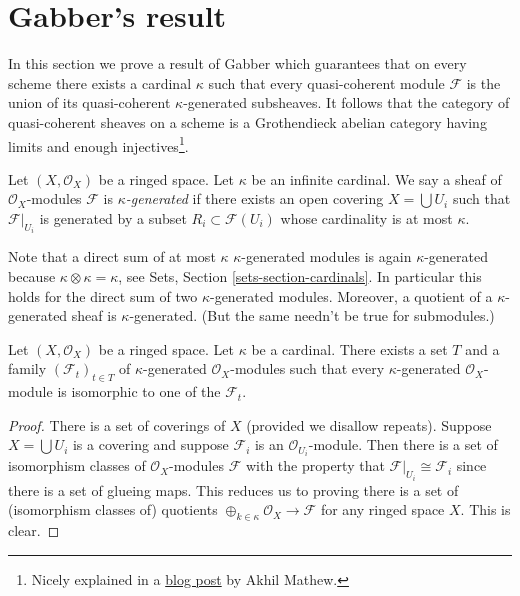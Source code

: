\section{Gabber's result}
\label{section-gabber}

\noindent
In this section we prove a result of Gabber which guarantees that on every
scheme there exists a cardinal $\kappa$ such that every quasi-coherent
module $\mathcal{F}$ is the union of its quasi-coherent
$\kappa$-generated subsheaves. It follows that the category of quasi-coherent
sheaves on a scheme is a Grothendieck abelian category having
limits and enough injectives\footnote{Nicely explained in a
\href{http://amathew.wordpress.com/2011/07/30/quasi-coherent-sheaves-presentable-categories-and-a-result-of-gabber/}{blog post}
by Akhil Mathew.}.

\begin{definition}
\label{definition-kappa-generated}
Let $(X, \mathcal{O}_X)$ be a ringed space. Let $\kappa$ be an infinite
cardinal. We say a sheaf of $\mathcal{O}_X$-modules $\mathcal{F}$ is
{\it $\kappa$-generated} if there exists an open covering
$X = \bigcup U_i$ such that $\mathcal{F}|_{U_i}$ is generated by
a subset $R_i \subset \mathcal{F}(U_i)$ whose cardinality is
at most $\kappa$.
\end{definition}

\noindent
Note that a direct sum of at most $\kappa$ $\kappa$-generated modules is
again $\kappa$-generated because $\kappa \otimes \kappa = \kappa$, see
Sets, Section \ref{sets-section-cardinals}.
In particular this holds for the direct sum of two $\kappa$-generated modules.
Moreover, a quotient of a $\kappa$-generated sheaf is $\kappa$-generated.
(But the same needn't be true for submodules.)

\begin{lemma}
\label{lemma-set-of-iso-classes}
Let $(X, \mathcal{O}_X)$ be a ringed space. Let $\kappa$ be a cardinal.
There exists a set $T$ and a family $(\mathcal{F}_t)_{t \in T}$ of
$\kappa$-generated $\mathcal{O}_X$-modules such that every $\kappa$-generated
$\mathcal{O}_X$-module is isomorphic to one of the $\mathcal{F}_t$.
\end{lemma}

\begin{proof}
There is a set of coverings of $X$ (provided we disallow repeats).
Suppose $X = \bigcup U_i$ is a covering and suppose $\mathcal{F}_i$
is an $\mathcal{O}_{U_i}$-module. Then there is a set of isomorphism
classes of $\mathcal{O}_X$-modules $\mathcal{F}$ with the property
that $\mathcal{F}|_{U_i} \cong \mathcal{F}_i$ since there is a set of
glueing maps. This reduces us to proving there is a set of (isomorphism
classes of) quotients
$\oplus_{k \in \kappa} \mathcal{O}_X \to \mathcal{F}$
for any ringed space $X$. This is clear.
\end{proof}

